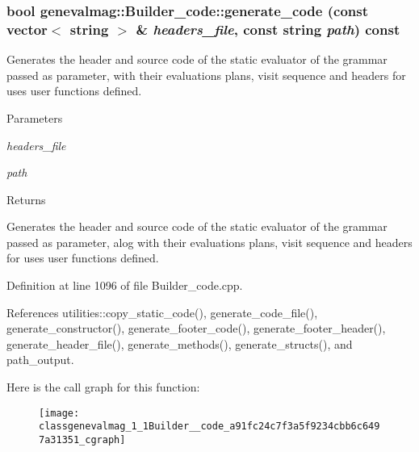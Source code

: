\hypertarget{classgenevalmag_1_1Builder__code_a91fc24c7f3a5f9234cbb6c6497a31351}{
\subsubsection[{generate\_\-code}]{\setlength{\rightskip}{0pt plus 5cm}bool genevalmag::Builder\_\-code::generate\_\-code (const vector$<$ string $>$ \& {\em headers\_\-file}, \/  const string {\em path}) const}}
\label{classgenevalmag_1_1Builder__code_a91fc24c7f3a5f9234cbb6c6497a31351}
Generates the header and source code of the static evaluator of the grammar passed as parameter, with their evaluations plans, visit sequence and headers for uses user functions defined. 
\begin{DoxyParams}{Parameters}
\item[{\em headers\_\-file}]\item[{\em path}]\end{DoxyParams}
\begin{DoxyReturn}{Returns}

\end{DoxyReturn}
Generates the header and source code of the static evaluator of the grammar passed as parameter, alog with their evaluations plans, visit sequence and headers for uses user functions defined. 

Definition at line 1096 of file Builder\_\-code.cpp.



References utilities::copy\_\-static\_\-code(), generate\_\-code\_\-file(), generate\_\-constructor(), generate\_\-footer\_\-code(), generate\_\-footer\_\-header(), generate\_\-header\_\-file(), generate\_\-methods(), generate\_\-structs(), and path\_\-output.



Here is the call graph for this function:\nopagebreak
\begin{figure}[H]
\begin{center}
\leavevmode
\texttt{[image: classgenevalmag\_1\_1Builder\_\_code\_a91fc24c7f3a5f9234cbb6c6497a31351\_cgraph]}
\end{center}
\end{figure}


